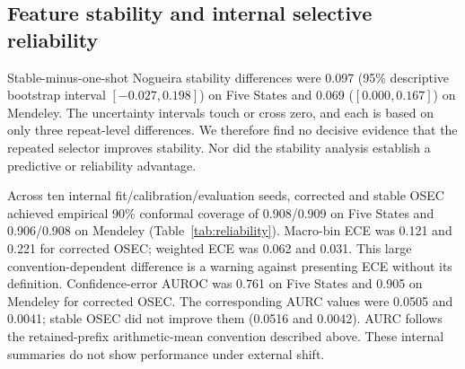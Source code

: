 \documentclass[conference]{IEEEtran}
\begin{document}
\begin{table}[t]
\centering
\caption{Corrected nested internal results for optimized voting. Fold summaries are internal benchmark evidence, not external validation.}
\label{tab:internal}
\footnotesize
{}
\end{table}

\subsection{Feature stability and internal selective reliability}
Stable-minus-one-shot Nogueira stability differences were 0.097 (95\% descriptive bootstrap interval $[-0.027,0.198]$) on Five States and 0.069 ($[0.000,0.167]$) on Mendeley. The uncertainty intervals touch or cross zero, and each is based on only three repeat-level differences. We therefore find no decisive evidence that the repeated selector improves stability. Nor did the stability analysis establish a predictive or reliability advantage.

Across ten internal fit/calibration/evaluation seeds, corrected and stable OSEC achieved empirical 90\% conformal coverage of 0.908/0.909 on Five States and 0.906/0.908 on Mendeley (Table~\ref{tab:reliability}). Macro-bin ECE was 0.121 and 0.221 for corrected OSEC; weighted ECE was 0.062 and 0.031. This large convention-dependent difference is a warning against presenting ECE without its definition. Confidence-error AUROC was 0.761 on Five States and 0.905 on Mendeley for corrected OSEC. The corresponding AURC values were 0.0505 and 0.0041; stable OSEC did not improve them (0.0516 and 0.0042). AURC follows the retained-prefix arithmetic-mean convention described above. These internal summaries do not show performance under external shift.

\begin{table}[t]
\centering
\caption{Ten-seed internal selective reliability. Coverage is empirical evaluation-partition coverage; ECE definitions differ by bin weighting.}
\label{tab:reliability}
\footnotesize
{}
\end{table}
\end{document}
